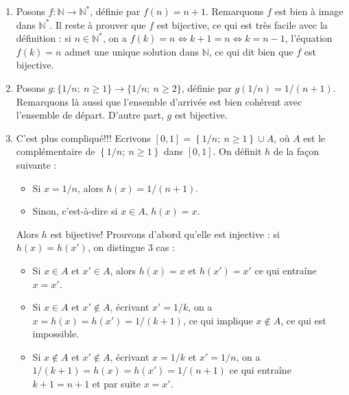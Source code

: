 \documentclass[11pt,a4paper]{article}
\newcommand{\mtn}{\mathbb{N}}\newcommand{\mtns}{\mathbb{N}^*}\newcommand{\mtz}{\mathbb{Z}}\newcommand{\mtr}{\mathbb{R}}\newcommand{\mtk}{\mathbb{K}}\newcommand{\mtq}{\mathbb{Q}}\newcommand{\mtc}{\mathbb{C}}\newcommand{\mch}{\mathcal{H}}\newcommand{\mcp}{\mathcal{P}}\newcommand{\mcb}{\mathcal{B}}\newcommand{\mcl}{\mathcal{L}}
\begin{document}
	\begin{corrige}
		\begin{enumerate}
			
			\item  Posons $f:\mtn\to \mtn^*$, définie par $f(n)=n+1$. Remarquons $f$ est bien à image dans $\mtn^*$. Il reste à prouver
			que $f$ est bijective, ce qui est très facile avec la définition : si $n\in\mtn^*$, on a $f(k)=n\iff k+1=n\iff k=n-1$, l'équation
			$f(k)=n$ admet une unique solution dans $\mtn$, ce qui dit bien que $f$ est bijective.
			
			\item  Posons $g:\{1/n;\ n\geq 1\}\to \{1/n;\ n\geq 2\}$, définie par $g(1/n)=1/(n+1)$. Remarquons là aussi que l'ensemble
			d'arrivée est bien cohérent avec l'ensemble de départ. D'autre part, $g$ est bijective.
			
			\item  C'est plus compliqué!!! Ecrivons $[0,1]=\left\{1/n;\ n\geq 1\right\}\cup A$, où $A$ est le complémentaire de $\left\{1/n;\ n\geq 1\right\}$
			dans $[0,1]$. On définit $h$ de la façon suivante :
			
			\begin{itemize}
				
				\item  Si $x=1/n$, alors $h(x)=1/(n+1)$.
				
				\item  Sinon, c'est-à-dire si $x\in A$, $h(x)=x$.
				
			\end{itemize}
			
			Alors $h$ est bijective! Prouvons d'abord qu'elle est injective : si $h(x)=h(x')$, on distingue 3 cas :
			
			\begin{itemize}
				
				\item  Si $x\in A$ et $x'\in A$, alors $h(x)=x$ et $h(x')=x'$ ce qui entraîne $x=x'$.
				
				\item  Si $x\in A$ et $x'\notin A$, écrivant $x'=1/k$, on a $x=h(x)=h(x')=1/(k+1)$, ce qui implique $x\notin A$, ce qui est impossible.
				
				\item  Si $x\notin A$ et $x'\notin A$, écrivant $x=1/k$ et $x'=1/n$, on a $1/(k+1)=h(x)=h(x')=1/(n+1)$ ce qui entraîne $k+1=n+1$ et par suite $x=x'$.
				
			\end{itemize}
			

\end{enumerate}
\end{corrige}
\end{document}
